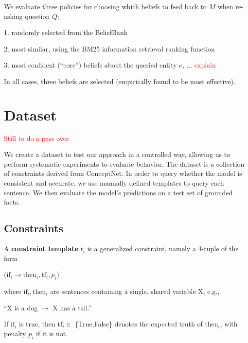 \documentclass[11pt]{article}
\newcommand{\red}[1]{\textcolor{red}{#1}}
\newenvironment{myquote}{                   %
  \parskip 0mm \begin{quoting}[vskip=0mm,leftmargin=2mm]}{
\end{quoting}}
\newenvironment{enu}{                   %
     \parskip 0cm \begin{list}{}{\parsep 0cm \itemsep 0cm \topsep 0cm}}{
       \end{list}} %
\begin{document}
We evaluate three policies for choosing which beliefs to feed back to $M$ when re-asking question $Q$:
\begin{enu}
\item[1.] randomly selected from the BeliefBank
\item[2.] most similar, using the BM25 information retrieval ranking function \cite{bm25}
\item[3.] most confident (``core'') beliefs about the queried entity $e$, ... \red{explain}
\end{enu}
In all cases, three beliefs are selected (empirically found to be most effective).

\section{Dataset \label{dataset}}

\red{Still to do a pass over}

We create a dataset to test our approach in a controlled way, allowing us to perform systematic experiments to evaluate behavior.
The dataset is a collection of constraints derived from ConceptNet. In order to query whether the model is consistent and accurate, we use manually defined templates to query each sentence. We then evaluate the model's predictions on a test set of grounded facts.

\subsection{Constraints}
A {\bf constraint template} $t_i$ is a generalized constraint, namely a 4-tuple of the form
\begin{myquote} \centering
($\textrm{if}_i \rightarrow \textrm{then}_i, \textrm{tf}_i, p_i$)
\end{myquote} 
where $\textrm{if}_i, \textrm{then}_i$ are sentences containing a single, shared variable X, e.g.,
\begin{myquote} \centering

``X is a dog $\rightarrow$ X has a tail.''
\end{myquote}
If $\textrm{if}_i$ is true, \textrm{then} $\textrm{tf}_i \in$ \{True,False\} denotes the expected truth of $\textrm{then}_i$, 
with penalty $p_i$ if it is not.
\end{document}
